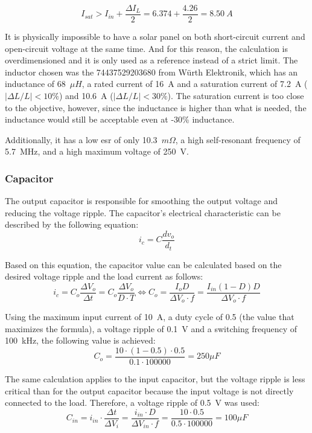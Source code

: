 \begin{equation}
    I_{sat} > I_{in} + \frac{\Delta I_L}{2} = 6.374 + \frac{4.26}{2} = 8.50~A
\end{equation}

It is physically impossible to have a solar panel on both short-circuit current and open-circuit voltage at the same time. And for this reason, the calculation is overdimensioned and it is only used as a reference instead of a strict limit.
The inductor chosen was the 74437529203680 from Würth Elektronik, which has an inductance of 68~$\mu H$, a rated current of 16~A and a saturation current of 7.2~A ($|\Delta L/L|<10\%$) and 10.6~A ($|\Delta L/L|<30\%$). The saturation current is too close to the objective, however, since the inductance is higher than what is needed, the inductance would still be acceptable even at -30\% inductance. 

Additionally, it has a low \ac{esr} of only 10.3~$m\Omega$, a high self-resonant frequency of 5.7~MHz, and a high maximum voltage of 250~V.

\subsubsection{Capacitor}
    The output capacitor is responsible for smoothing the output voltage and reducing the voltage ripple. The capacitor's electrical characteristic can be described by the following equation:
    \begin{equation}
        i_c = C \frac{dv_o}{d_t}
    \end{equation}

    Based on this equation, the capacitor value can be calculated based on the desired voltage ripple and the load current as follows:
    \begin{equation}
        i_c = C_o  \frac{\Delta V_o}{\Delta t} = C_o \frac{\Delta V_o}{D \cdot T } \Leftrightarrow C_o = \frac{I_o D}{\Delta V_o \cdot f} = \frac{I_{in} (1-D)D}{\Delta V_o \cdot f}
    \end{equation}

    Using the maximum input current of 10~A, a duty cycle of 0.5 (the value that maximizes the formula), a voltage ripple of 0.1~V and a switching frequency of 100~kHz, the following value is achieved:
    \begin{equation}
        C_o = \frac{10 \cdot (1-0.5) \cdot 0.5}{0.1 \cdot 100000} = 250 \mu F
    \end{equation}

    The same calculation applies to the input capacitor, but the voltage ripple is less critical than for the output capacitor because the input voltage is not directly connected to the load. Therefore, a voltage ripple of 0.5~V was used:
    \begin{equation}
        C_{in} = i_{in} \cdot \frac{\Delta t}{\Delta V_i} = \frac{i_{in} \cdot D}{\Delta V_{in} \cdot f}  =  \frac{10 \cdot 0.5}{0.5 \cdot 100000} = 100 \mu F
    \end{equation}

